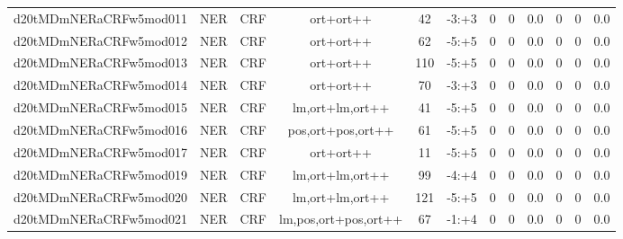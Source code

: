 \documentclass[a4paper]{article}
\begin{document}
\begin{landscape}
\begin{center}
\begin{tabular}{ |c|c|c|c|c|c|c|c|c|c|c|c|}
 
 	
 	\small{ d20tMDmNERaCRFw5mod011 } & \small{ NER} & \small{  CRF }  & ort+ort++  &  42 &  \small{  -3:+3 }  &  0 & 0 & 0.0  &  0 & 0 & 0.0 \\
 	

 
 	
 	\small{ d20tMDmNERaCRFw5mod012 } & \small{ NER} & \small{  CRF }  & ort+ort++  &  62 &  \small{  -5:+5 }  &  0 & 0 & 0.0  &  0 & 0 & 0.0 \\
 	

 
 	
 	\small{ d20tMDmNERaCRFw5mod013 } & \small{ NER} & \small{  CRF }  & ort+ort++  &  110 &  \small{  -5:+5 }  &  0 & 0 & 0.0  &  0 & 0 & 0.0 \\
 	

 
 	
 	\small{ d20tMDmNERaCRFw5mod014 } & \small{ NER} & \small{  CRF }  & ort+ort++  &  70 &  \small{  -3:+3 }  &  0 & 0 & 0.0  &  0 & 0 & 0.0 \\
 	

 
 	
 	\small{ d20tMDmNERaCRFw5mod015 } & \small{ NER} & \small{  CRF }  & lm,ort+lm,ort++  &  41 &  \small{  -5:+5 }  &  0 & 0 & 0.0  &  0 & 0 & 0.0 \\
 	

 
 	
 	\small{ d20tMDmNERaCRFw5mod016 } & \small{ NER} & \small{  CRF }  & pos,ort+pos,ort++  &  61 &  \small{  -5:+5 }  &  0 & 0 & 0.0  &  0 & 0 & 0.0 \\
 	

 
 	
 	\small{ d20tMDmNERaCRFw5mod017 } & \small{ NER} & \small{  CRF }  & ort+ort++  &  11 &  \small{  -5:+5 }  &  0 & 0 & 0.0  &  0 & 0 & 0.0 \\
 	

 
 	
 	\small{ d20tMDmNERaCRFw5mod019 } & \small{ NER} & \small{  CRF }  & lm,ort+lm,ort++  &  99 &  \small{  -4:+4 }  &  0 & 0 & 0.0  &  0 & 0 & 0.0 \\
 	

 
 	
 	\small{ d20tMDmNERaCRFw5mod020 } & \small{ NER} & \small{  CRF }  & lm,ort+lm,ort++  &  121 &  \small{  -5:+5 }  &  0 & 0 & 0.0  &  0 & 0 & 0.0 \\
 	

 
 	
 	\small{ d20tMDmNERaCRFw5mod021 } & \small{ NER} & \small{  CRF }  & lm,pos,ort+pos,ort++  &  67 &  \small{  -1:+4 }  &  0 & 0 & 0.0  &  0 & 0 & 0.0 \\
 	


\end{tabular}
\end{center}
\end{landscape}
\end{document}
